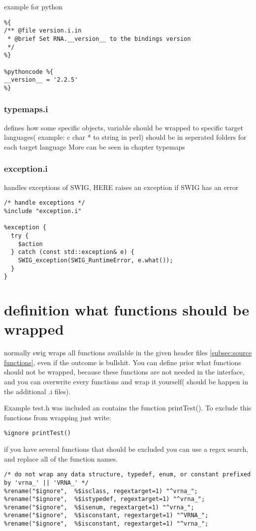 \documentclass[ twoside,openright,titlepage,numbers=noenddot,headinclude,
                footinclude=true, cleardoublepage=empty,abstractoff, 
                BCOR=5mm,paper=a4,fontsize=11pt,
                ngerman,american,
                ]{scrreprt} %
\begin{document}
example for python
\begin{lstlisting}
%{
/** @file version.i.in
 * @brief Set RNA.__version__ to the bindings version
 */
%}

%pythoncode %{
__version__ = '2.2.5'
%}
\end{lstlisting}


\subsubsection{typemaps.i}
defines how some specific objects, variable should be wrapped to specific target languages( example: c char * to string in perl)
should be in seperated folders for each target language
More can be seen in chapter typemaps

\subsubsection{exception.i}
handles exceptions of SWIG, HERE raises an exception if SWIG has an error

\begin{lstlisting}
/* handle exceptions */
%include "exception.i"

%exception {
  try {
    $action
  } catch (const std::exception& e) {
    SWIG_exception(SWIG_RuntimeError, e.what());
  }
}
\end{lstlisting}



\section{definition what functions should be wrapped}
normally swig wraps all functions available in the given header files \ref{subsec:source functions}, even if the outcome is bullshit. You can define prior what functions should not be wrapped, because these functions are not needed in the interface, and you can overwrite every functions and wrap it yourself( should be happen in the additional .i files).

Example test.h was included an contains the function printTest(). To exclude this functions from wrapping just write: 
\begin{lstlisting} 
%ignore printTest() 
\end{lstlisting}

if you have several functions that should be excluded you can use a regex search, and replace all of the function names.
\begin{lstlisting}
/* do not wrap any data structure, typedef, enum, or constant prefixed by 'vrna_' || 'VRNA_' */
%rename("$ignore",  %$isclass, regextarget=1) "^vrna_";
%rename("$ignore",  %$istypedef, regextarget=1) "^vrna_";
%rename("$ignore",  %$isenum, regextarget=1) "^vrna_";
%rename("$ignore",  %$isconstant, regextarget=1) "^VRNA_";
%rename("$ignore",  %$isconstant, regextarget=1) "^vrna_";
\end{lstlisting}
\end{document}
